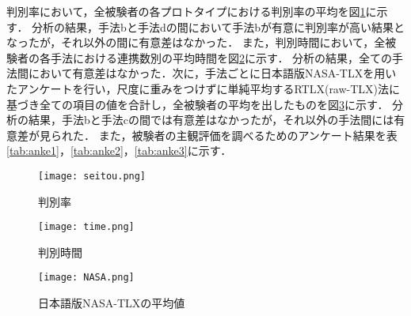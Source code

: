 \documentclass[a4j,12pt,twoside]{jreport}
\begin{document}
判別率において，全被験者の各プロトタイプにおける判別率の平均を図\ref{fig:ans}に示す．
分析の結果，手法bと手法dの間において手法bが有意に判別率が高い結果となったが，それ以外の間に有意差はなかった．
また，判別時間において，全被験者の各手法における連携数別の平均時間を図\ref{fig:time}に示す．
分析の結果，全ての手法間において有意差はなかった．次に，手法ごとに日本語版NASA-TLXを用いたアンケートを行い，尺度に重みをつけずに単純平均するRTLX(raw-TLX)法\cite{rnasa}に基づき全ての項目の値を合計し，全被験者の平均を出したものを図\ref{fig:nasa}に示す．
分析の結果，手法bと手法cの間では有意差はなかったが，それ以外の手法間には有意差が見られた．
また，被験者の主観評価を調べるためのアンケート結果を表\ref{tab:anke1}，\ref{tab:anke2}，\ref{tab:anke3}に示す． 

\begin{figure}[p]
  \centering
  \texttt{[image: seitou.png]}
     \caption{判別率}
        \label{fig:ans}
\end{figure}
\begin{figure}[p]
  \centering
  \texttt{[image: time.png]}
     \caption{判別時間}
        \label{fig:time}
\end{figure}
\begin{figure}[p]
  \centering
  \texttt{[image: NASA.png]}
     \caption{日本語版NASA-TLXの平均値}
        \label{fig:nasa}
\end{figure}
\end{document}
